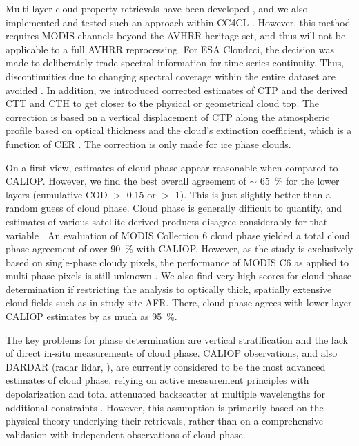 Multi-layer cloud property retrievals have been developed \citep{Watts11}, and we also implemented and tested such an approach within CC4CL \citep{GregMulti17}. However, this method requires MODIS channels beyond the AVHRR heritage set, and thus will not be applicable to a full AVHRR reprocessing. For ESA Cloud\textunderscore cci, the decision was made to deliberately trade spectral information for time series continuity. Thus, discontinuities due to changing spectral coverage within the entire dataset are avoided \citep{Stengel17}. In addition, we introduced corrected estimates of CTP and the derived CTT and CTH to get closer to the physical or geometrical cloud top. The correction is based on a vertical displacement of CTP along the atmospheric profile based on optical thickness and the cloud's extinction coefficient, which is a function of CER \citep{GregConsistency17}. The correction is only made for ice phase clouds.

On a first view, estimates of cloud phase appear reasonable when compared to CALIOP. However, we find the best overall agreement of $\sim$ 65~\% for the lower layers (cumulative COD $>$ 0.15 or $>$ 1). This is just slightly better than a random guess of cloud phase. Cloud phase is generally difficult to quantify, and estimates of various satellite derived products disagree considerably for that variable \citep{Stengel15}. An evaluation of MODIS Collection 6 cloud phase yielded a total cloud phase agreement of over 90~\% with CALIOP. However, as the study is exclusively based on single-phase cloudy pixels, the performance of MODIS C6 as applied to multi-phase pixels is still unknown \citep{Marchant16}. We also find very high scores for cloud phase determination if restricting the analysis to optically thick, spatially extensive cloud fields such as in study site AFR. There, cloud phase agrees with lower layer CALIOP estimates by as much as 95~\%. 

The key problems for phase determination are vertical stratification and the lack of direct in-situ measurements of cloud phase. CALIOP observations, and also DARDAR (radar lidar, \citet{Ceccaldi13}), are currently considered to be the most advanced estimates of cloud phase, relying on active measurement principles with depolarization and total attenuated backscatter at multiple wavelengths for additional constraints \citep{Winker09,Karlsson10}. However, this assumption is primarily based on the physical theory underlying their retrievals, rather than on a comprehensive validation with independent observations of cloud phase. 

